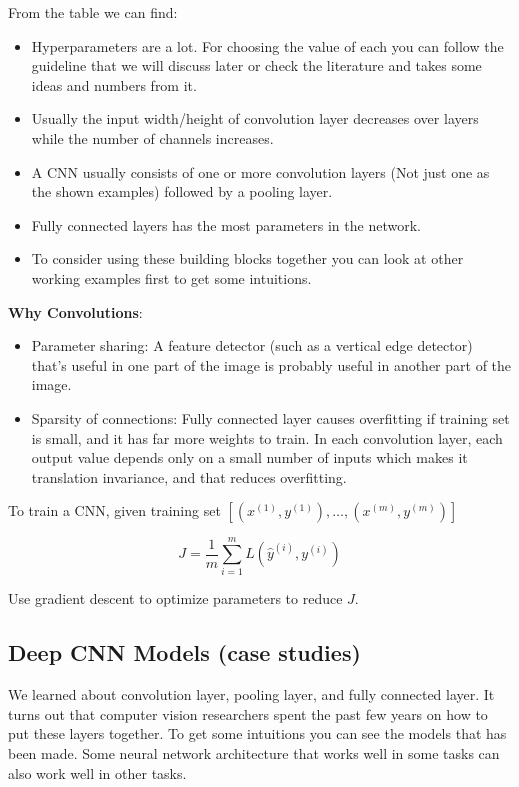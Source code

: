 \documentclass{article}
\begin{document}
\noindent From the table we can find:

\begin{itemize}
    \item Hyperparameters are a lot. For choosing the value of each you can follow the guideline that we will discuss later or check the literature and takes some ideas and numbers from it.
    \item Usually the input width/height of convolution layer decreases over layers while the number of channels increases.
    \item A CNN usually consists of one or more convolution layers (Not just one as the shown examples) followed by a pooling layer.
    \item Fully connected layers has the most parameters in the network.
    \item To consider using these building blocks together you can look at other working examples first to get some intuitions.
\end{itemize}

\noindent \textbf{Why Convolutions}:

\begin{itemize}
    \item Parameter sharing: A feature detector (such as a vertical edge detector) that's useful in one part of the image is probably useful in another part of the image.
    \item Sparsity of connections: Fully connected layer causes overfitting if training set is small, and it has far more weights to train. In each convolution layer, each output value depends only on a small number of inputs which makes it translation invariance, and that reduces overfitting.
\end{itemize}

\noindent To train a CNN, given training set \([(x^{(1)}, y^{(1)}), \dots, (x^{(m)}, y^{(m)})]\)

\[J = \frac{1}{m} \sum_{i = 1}^{m} L(\hat{y}^{(i)}, y^{(i)})\]

\noindent Use gradient descent to optimize parameters to reduce \(J\).

\subsection{Deep CNN Models (case studies)}

\noindent We learned about convolution layer, pooling layer, and fully connected layer. It turns out that computer vision researchers spent the past few years on how to put these layers together. To get some intuitions you can see the models that has been made. Some neural network architecture that works well in some tasks can also work well in other tasks.
\end{document}
